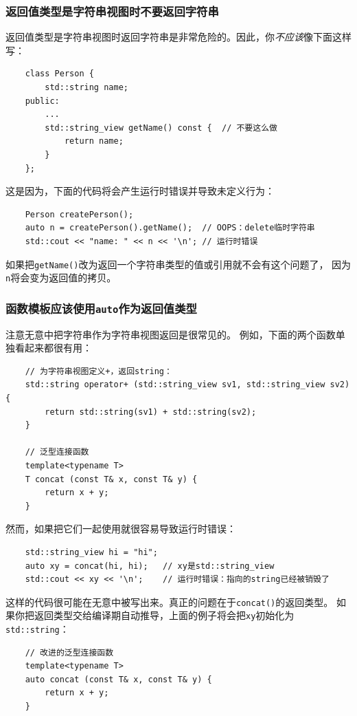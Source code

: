 \subsubsection{返回值类型是字符串视图时不要返回字符串}
返回值类型是字符串视图时返回字符串是非常危险的。因此，你\emph{不应该}像下面这样写：
\begin{lstlisting}
    class Person {
        std::string name;
    public:
        ...
        std::string_view getName() const {  // 不要这么做
            return name;
        }
    };
\end{lstlisting}
这是因为，下面的代码将会产生运行时错误并导致未定义行为：
\begin{lstlisting}
    Person createPerson();
    auto n = createPerson().getName();  // OOPS：delete临时字符串
    std::cout << "name: " << n << '\n'; // 运行时错误
\end{lstlisting}
如果把\texttt{getName()}改为返回一个字符串类型的值或引用就不会有这个问题了，
因为\texttt{n}将会变为返回值的拷贝。

\subsubsection{函数模板应该使用\texttt{auto}作为返回值类型}
注意无意中把字符串作为字符串视图返回是很常见的。
例如，下面的两个函数单独看起来都很有用：
\begin{lstlisting}
    // 为字符串视图定义+，返回string：
    std::string operator+ (std::string_view sv1, std::string_view sv2) {
        return std::string(sv1) + std::string(sv2);
    }

    // 泛型连接函数
    template<typename T>
    T concat (const T& x, const T& y) {
        return x + y;
    }
\end{lstlisting}
然而，如果把它们一起使用就很容易导致运行时错误：
\begin{lstlisting}
    std::string_view hi = "hi";
    auto xy = concat(hi, hi);   // xy是std::string_view
    std::cout << xy << '\n';    // 运行时错误：指向的string已经被销毁了
\end{lstlisting}
这样的代码很可能在无意中被写出来。真正的问题在于\texttt{concat()}的返回类型。
如果你把返回类型交给编译期自动推导，上面的例子将会把\texttt{xy}初始化为\texttt{std::string}：
\begin{lstlisting}
    // 改进的泛型连接函数
    template<typename T>
    auto concat (const T& x, const T& y) {
        return x + y;
    }
\end{lstlisting}

